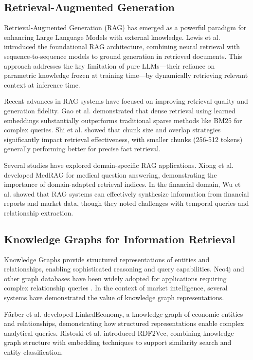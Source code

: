 \documentclass[11pt,twocolumn]{article}
\begin{document}
\subsection{Retrieval-Augmented Generation}

Retrieval-Augmented Generation (RAG) has emerged as a powerful paradigm for enhancing Large Language Models with external knowledge. Lewis et al. \cite{lewis2020rag} introduced the foundational RAG architecture, combining neural retrieval with sequence-to-sequence models to ground generation in retrieved documents. This approach addresses the key limitation of pure LLMs—their reliance on parametric knowledge frozen at training time—by dynamically retrieving relevant context at inference time.

Recent advances in RAG systems have focused on improving retrieval quality and generation fidelity. Gao et al. \cite{gao2023rag} demonstrated that dense retrieval using learned embeddings substantially outperforms traditional sparse methods like BM25 for complex queries. Shi et al. \cite{shi2023replicable} showed that chunk size and overlap strategies significantly impact retrieval effectiveness, with smaller chunks (256-512 tokens) generally performing better for precise fact retrieval.

Several studies have explored domain-specific RAG applications. Xiong et al. \cite{xiong2023medrag} developed MedRAG for medical question answering, demonstrating the importance of domain-adapted retrieval indices. In the financial domain, Wu et al. \cite{wu2023finrag} showed that RAG systems can effectively synthesize information from financial reports and market data, though they noted challenges with temporal queries and relationship extraction.

\subsection{Knowledge Graphs for Information Retrieval}

Knowledge Graphs provide structured representations of entities and relationships, enabling sophisticated reasoning and query capabilities. Neo4j and other graph databases have been widely adopted for applications requiring complex relationship queries \cite{robinson2015graph}. In the context of market intelligence, several systems have demonstrated the value of knowledge graph representations.

Färber et al. \cite{farber2018linkedeconomy} developed LinkedEconomy, a knowledge graph of economic entities and relationships, demonstrating how structured representations enable complex analytical queries. Ristoski et al. \cite{ristoski2016rdf2vec} introduced RDF2Vec, combining knowledge graph structure with embedding techniques to support similarity search and entity classification.
\end{document}
